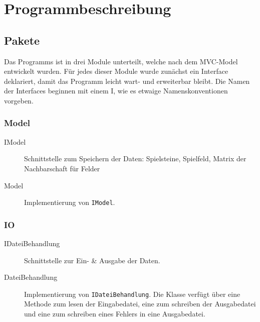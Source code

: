 \chapter{Programmbeschreibung}
\label{chap:Programmbeschreibung}
\section{Pakete}
Das Programms ist in drei Module unterteilt, welche nach dem MVC-Model entwickelt wurden. Für jedes dieser Module wurde zunächst ein Interface deklariert, damit das Programm leicht wart- und erweiterbar bleibt. Die Namen der Interfaces beginnen mit einem \glqq I\grqq, wie es etwaige Namenskonventionen vorgeben.
\clearpage
\subsection{Model}
\begin{description}
	\item[IModel] Schnittstelle zum Speichern der Daten: Spielsteine, Spielfeld, Matrix der Nachbarschaft für Felder
	\item [Model] Implementierung von \lstinline{IModel}.
\end{description}

\subsection{IO}
\begin{description}
	\item [IDateiBehandlung] Schnittstelle zur Ein- \& Ausgabe der Daten.
	\item [DateiBehandlung] Implementierung von \lstinline{IDateiBehandlung}. Die Klasse verfügt über eine Methode zum lesen der Eingabedatei, eine zum schreiben der Ausgabedatei und eine zum schreiben eines Fehlers in eine Ausgabedatei.
\end{description}


